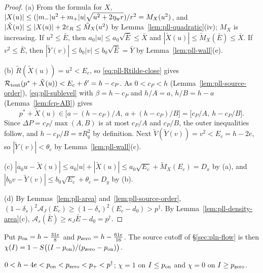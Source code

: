 \begin{proof}
(a) From the formula for $X$, $|X(u)|\le(|m_-|u^2+m_+|u|\sqrt{u^2+2\eta_{\rm w} r})/r^2=M_X(u^2)$, and
$|\tilde X(u)|\le|X(u)|+2\varepsilon_R\le\tilde M_X(u^2)$ by Lemma~\ref{lem:pll-quadratic}(iv); $M_X$ is increasing. If
$u^2\le\bar E$, then $a_0|u|\le a_0\sqrt{\bar E}\le\bar X$ and $|\tilde X(u)|\le\tilde M_X(\bar E)\le\bar X$. If
$v^2\le\bar E$, then $|\tilde Y(v)|\le b_0|v|\le b_0\sqrt{\bar E}=\bar Y$ by Lemma~\ref{lem:pll-wall}(e).

(b) $\tilde R(\tilde X(u))=u^2<E_c$, so \eqref{eq:pll-Rtilde-close} gives
$\mathcal{R}_{\rm tent}(p^*+\tilde X(u))<E_c+\delta'=h-c_P$. As $0<c_P<h$ (Lemma~\ref{lem:pll-source-order}),
\eqref{eq:pll-sublevel} with $\beta=h-c_P$ and $h/A=a$, $h/B=h-a$ (Lemma~\ref{lem:fcp-AB}) gives
\[
 p^*+\tilde X(u)\in\bigl[a-(h-c_P)/A,\ a+(h-c_P)/B\bigr]=\bigl[c_P/A,\ h-c_P/B\bigr].
\]
Since $\Delta P=c_P/\max(A,B)$ is at most $c_P/A$ and $c_P/B$, the outer inequalities follow, and
$h-c_P/B=\pi R_q^2$ by definition. Next $\tilde V(\tilde Y(v))=v^2<E_c=h-2e$, so $|\tilde Y(v)|<\theta_c$ by
Lemma~\ref{lem:pll-wall}(c).

(c) $|a_0u-\tilde X(u)|\le a_0|u|+|\tilde X(u)|\le a_0\sqrt{E_c}+\tilde M_X(E_c)=D_x$ by (a), and
$|b_0v-\tilde Y(v)|\le b_0\sqrt{E_c}+\theta_c=D_y$ by (b).

(d) By Lemmas~\ref{lem:pll-area} and~\ref{lem:pll-source-order},
$(1-\delta_s)^2\mathcal A_J(E_c)\ge(1-\delta_s)^2(E_c-d_0)>p^\dagger$. By Lemma~\ref{lem:pll-density-area}(c),
$\mathcal A_s(\bar E)\ge\kappa_J\bar E-d_0=p^\dagger$.
\end{proof}

\begin{definition}\label{def:pll-cutoff}
Put $p_{\rm on}=h-\frac{31e}8$ and $p_{\rm zero}=h-\frac{61e}{16}$. The source cutoff of \S\ref{sec:pln-flow} is
then $\chi(I)=1-S\bigl((I-p_{\rm on})/(p_{\rm zero}-p_{\rm on})\bigr)$.
\end{definition}

\begin{lemma}\label{lem:pll-cutoff}
$0<h-4e<p_{\rm on}<p_{\rm zero}<p_+<p^\dagger$; $\chi=1$ on $I\le p_{\rm on}$ and $\chi=0$ on $I\ge p_{\rm zero}$.
\end{lemma}

